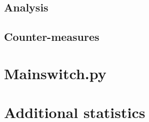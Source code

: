 \documentclass[british,10pt,a4paper]{article}
\begin{document}
\subsection{Analysis}
\subsection{Counter-measures}




\clearpage


\clearpage
\begin{appendices}

	\section{Mainswitch.py}\label{app:mainswitch}
	

	\section{Additional statistics}\label{app:extra_stats}

\end{appendices}
\end{document}
